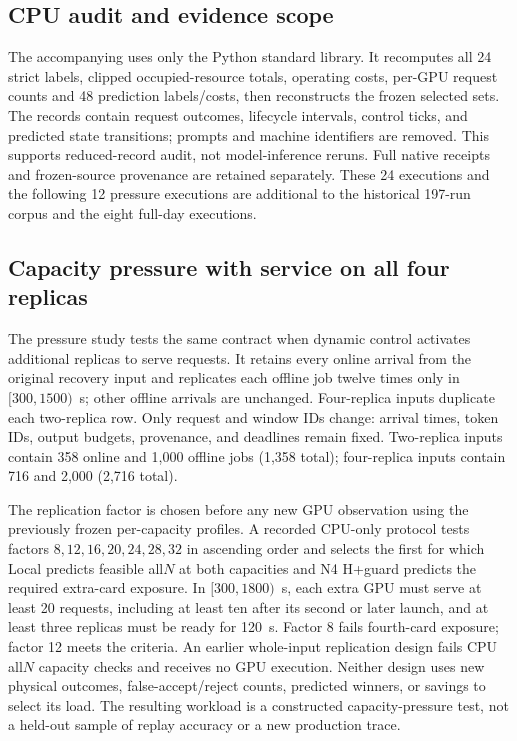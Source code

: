 \subsection{CPU audit and evidence scope}
The accompanying  uses only the
Python standard library. It recomputes all 24 strict labels, clipped
occupied-resource totals, operating costs, per-GPU request counts and
48 prediction labels/costs, then reconstructs the frozen selected sets.
The records contain request outcomes, lifecycle intervals, control ticks,
and predicted state transitions; prompts and machine identifiers are removed.
This supports reduced-record audit, not model-inference reruns. Full native
receipts and frozen-source provenance are retained separately. These 24
executions and the following 12 pressure executions are additional to the
historical 197-run corpus and the eight full-day executions.

\subsection{Capacity pressure with service on all four replicas}
\label{sec:capacity-pressure}
The pressure study tests the same contract when dynamic control activates
additional replicas to serve requests. It retains every online arrival from the
original recovery input and replicates each offline job twelve times only
in $[300,1500)$~s; other offline arrivals are unchanged. Four-replica inputs
duplicate each two-replica row. Only request and window IDs change: arrival
times, token IDs, output budgets, provenance, and deadlines remain fixed.
Two-replica inputs contain 358 online and 1,000 offline jobs (1,358 total);
four-replica inputs contain 716 and 2,000 (2,716 total).

The replication factor is chosen before any new GPU observation using the
previously frozen per-capacity profiles. A recorded CPU-only protocol tests
factors $8,12,16,20,24,28,32$ in ascending order and selects the first for
which Local predicts feasible all$N$ at both capacities and N4 H+guard
predicts the required extra-card exposure. In $[300,1800)$~s, each extra
GPU must serve at least 20 requests, including at least ten after its second
or later launch, and at least three replicas must be ready for 120~s.
Factor 8 fails fourth-card exposure; factor 12 meets the criteria.
An earlier whole-input replication design fails CPU all$N$ capacity checks
and receives no GPU execution. Neither design uses new physical outcomes,
false-accept/reject counts, predicted winners, or savings to select its load.
The resulting workload is a constructed capacity-pressure test, not a
held-out sample of replay accuracy or a new production trace.

